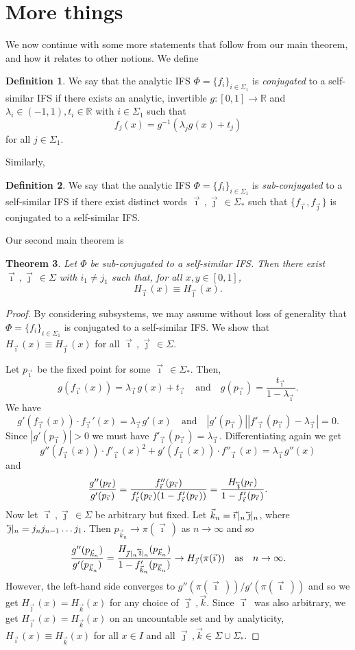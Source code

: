 \documentclass[12pt,]{article}
\newtheorem{theorem}{Theorem}[section]
\theoremstyle{definition}
\newtheorem{definition}[theorem]{Definition}
\theoremstyle{remark}
\renewcommand{\Bbb}[1]{\mathbb{#1}}
\newcommand{\bbR}{{\Bbb R}}        %
\newcommand{\0}{\mathbf{0}}
\newcommand{\cev}[1]{\reflectbox{\ensuremath{\vec{\reflectbox{\ensuremath{#1}}}}}}
\newcommand{\bi}{\vec{\imath}\,}
\newcommand{\bj}{\vec{\jmath}\,}
\newcommand{\bk}{{\vec{k}}}
\newcommand{\bbi}{\,\cev{\imath}}
\newcommand{\bbj}{\,\cev{\jmath}}
\begin{document}
\section{More things}
We now continue with some more statements that follow from our main theorem, and how it relates to
other notions.
We define
\begin{definition}
  We say that the analytic IFS $\Phi = \{f_i\}_{i\in\Sigma_1}$ is \emph{conjugated} to a
  self-similar IFS if there exists an analytic, invertible $g:[0,1]\to\bbR$ and $\lambda_i
  \in(-1,1), t_i\in\bbR$ with $i\in\Sigma_1$ such that 
  \[
    f_{j}(x) = g^{-1}(\lambda_j g(x) + t_j)
  \]
  for all $j\in\Sigma_1$.
\end{definition}
Similarly,
\begin{definition}
  We say that the analytic IFS $\Phi = \{f_i\}_{i\in\Sigma_1}$ is \emph{sub-conjugated} to a
  self-similar IFS if there exist distinct words $\bi,\bj\in\Sigma_*$ such that 
  $\{f_{\bi},f_{\bj}\}$ is conjugated to a self-similar IFS.
\end{definition}
Our second main theorem is
\begin{theorem}
  Let $\Phi$ be sub-conjugated to a self-similar IFS. Then there exist $\bi,\bj\in\Sigma$ with
  $i_1\neq j_1$ such that, for all $x,y\in[0,1]$,
  \[
    H_{\bi}(x) \equiv H_{\bj}(x).
  \]
\end{theorem}
\begin{proof}
  By considering subsystems, we may assume without loss of generality that $\Phi =
  \{f_i\}_{i\in\Sigma_1}$ is conjugated to a self-similar IFS.
  We show that $H_{\bi}(x) \equiv H_{\bj}(x)$ for all $\bi,\bj\in\Sigma$.
  
  Let $p_{\bi}$ be the fixed point for some $\bi\in\Sigma_*$. Then,
  \[
    g(f_{\bi}(x)) = \lambda_{\bi} g(x) + t_{\bi}
    \quad\text{and}\quad
    g(p_{\bi}) = \frac{t_{\bi}}{1-\lambda_{\bi}}.
  \]
  We have
  \[
    g'(f_{\bi}(x))\cdot f_{\bi}'(x) = \lambda_{\bi} g'(x)
    \quad\text{and}\quad
    |g'(p_{\bi})||f'_{\bi}(p_{\bi})-\lambda_{\bi}| = 0.
  \]
  Since $|g'(p_{\bi})|>0$ we must have $f'_{\bi}(p_{\bi}) = \lambda_{\bi}$.
  Differentiating again we get
  \[
    g''(f_{\bi}(x))\cdot f'_{\bi}(x)^2 +g'(f_{\bi}(x))\cdot f''_{\bi}(x) = \lambda_{\bi} g''(x)
  \]
  and
  \[
    \frac{g''(p_{\bi})}{g'(p_{\bi})} =
    \frac{f_{\bi}''(p_{\bi})}{f_{\bi}'(p_{\bi})(1-f'_{\bi}(p_{\bi}))}
    =\frac{H_{\bbi}(p_{\bi})}{1-f'_{\bi}(p_{\bi})}.
  \]
  Now let $\bi,\bj\in\Sigma$ be arbitrary but fixed. Let $\bk_n = \bi|_n \bbj|_n$, where $\bbj|_n =
  j_nj_{n-1}\dots j_1$.
  Then $p_{\bk_n}\to \pi(\bi)$ as $n\to\infty$ and so
  \[
    \frac{g''(p_{\bk_n})}{g'(p_{\bk_n})} 
    =\frac{H_{\bj|_n \bbi|_n}(p_{\bk_n})}{1-f'_{\bk_n}(p_{\bk_n})}
    \to
    H_{\bj}(\pi(\bi))\quad \text{as}\quad n\to\infty.
  \]
  However, the left-hand side converges to $g''(\pi(\bi))/g'(\pi(\bi))$ and so we get $H_{\bj}(x) =
  H_{\bk}(x)$ for any choice of $\bj,\bk$. Since $\bi$ was also arbitrary, we get $H_{\bj}(x) =
  H_{\bk}(x)$ on an uncountable set and by analyticity, $H_{\bi}(x)\equiv H_{\bk}(x)$ for all $x\in I$
  and all $\bj,\bk\in \Sigma\cup \Sigma_*$.
\end{proof}
\end{document}

